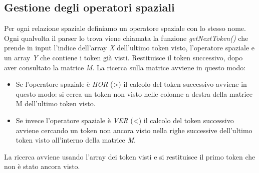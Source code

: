 \subsection{Gestione degli operatori spaziali}
Per ogni relazione spaziale definiamo un operatore spaziale con lo stesso nome. Ogni qualvolta il parser lo trova viene chiamata la funzione \textit{getNextToken()} che prende in input l'indice dell'array \textit{X} dell'ultimo token visto, l'operatore spaziale e un array \textit{Y} che contiene i token già visti. Restituisce il token successivo, dopo aver consultato la matrice \textit{M}. La ricerca sulla matrice avviene in questo modo:
\begin{itemize}
	\item Se l'operatore spaziale è \textit{HOR} (>) il calcolo del token successivo avviene in questo modo: si cerca un token non visto nelle colonne a destra della matrice M dell'ultimo token visto.
	\item Se invece l'operatore spaziale è \textit{VER} (<) il calcolo del token successivo avviene cercando un token non ancora visto nella righe successive dell'ultimo token visto all'interno della matrice \textit{M}.
\end{itemize}
La ricerca avviene usando l'array dei token visti e si restituisce il primo token che non è stato ancora visto.